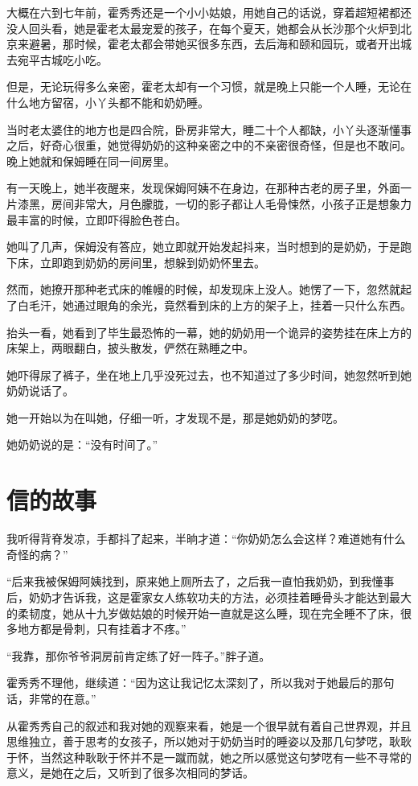 大概在六到七年前，霍秀秀还是一个小小姑娘，用她自己的话说，穿着超短裙都还没人回头看，她是霍老太最宠爱的孩子，在每个夏天，她都会从长沙那个火炉到北京来避暑，那时候，霍老太都会带她买很多东西，去后海和颐和园玩，或者开出城去宛平古城吃小吃。

但是，无论玩得多么亲密，霍老太却有一个习惯，就是晚上只能一个人睡，无论在什么地方留宿，小丫头都不能和奶奶睡。

当时老太婆住的地方也是四合院，卧房非常大，睡二十个人都缺，小丫头逐渐懂事之后，好奇心很重，她觉得奶奶的这种亲密之中的不亲密很奇怪，但是也不敢问。晚上她就和保姆睡在同一间房里。

有一天晚上，她半夜醒来，发现保姆阿姨不在身边，在那种古老的房子里，外面一片漆黑，房间非常大，月色朦胧，一切的影子都让人毛骨悚然，小孩子正是想象力最丰富的时候，立即吓得脸色苍白。

她叫了几声，保姆没有答应，她立即就开始发起抖来，当时想到的是奶奶，于是跑下床，立即跑到奶奶的房间里，想躲到奶奶怀里去。

然而，她撩开那种老式床的帷幔的时候，却发现床上没人。她愣了一下，忽然就起了白毛汗，她通过眼角的余光，竟然看到床的上方的架子上，挂着一只什么东西。

抬头一看，她看到了毕生最恐怖的一幕，她的奶奶用一个诡异的姿势挂在床上方的床架上，两眼翻白，披头散发，俨然在熟睡之中。

她吓得尿了裤子，坐在地上几乎没死过去，也不知道过了多少时间，她忽然听到她奶奶说话了。

她一开始以为在叫她，仔细一听，才发现不是，那是她奶奶的梦呓。

她奶奶说的是：“没有时间了。”

\chapter{信的故事}

我听得背脊发凉，手都抖了起来，半晌才道：“你奶奶怎么会这样？难道她有什么奇怪的病？”

“后来我被保姆阿姨找到，原来她上厕所去了，之后我一直怕我奶奶，到我懂事后，奶奶才告诉我，这是霍家女人练软功夫的方法，必须挂着睡骨头才能达到最大的柔韧度，她从十九岁做姑娘的时候开始一直就是这么睡，现在完全睡不了床，很多地方都是骨刺，只有挂着才不疼。”

“我靠，那你爷爷洞房前肯定练了好一阵子。”胖子道。

霍秀秀不理他，继续道：“因为这让我记忆太深刻了，所以我对于她最后的那句话，非常的在意。”

从霍秀秀自己的叙述和我对她的观察来看，她是一个很早就有着自己世界观，并且思维独立，善于思考的女孩子，所以她对于奶奶当时的睡姿以及那几句梦呓，耿耿于怀，当然这种耿耿于怀并不是一蹴而就，她之所以感觉这句梦呓有一些不寻常的意义，是她在之后，又听到了很多次相同的梦话。

